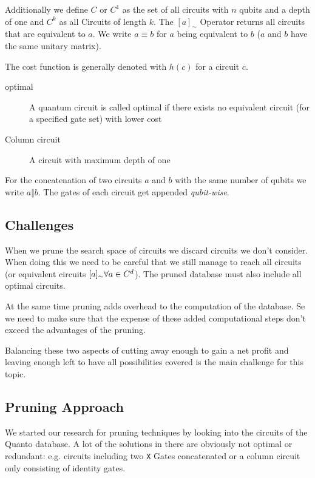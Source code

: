 Additionally we define $C$ or $C^1$ as the set of all circuits with $n$ qubits and a depth of one and $C^k$ as all Circuits of length $k$. The $[a]_\sim$ Operator returns all circuits that are equivalent to $a$. We write $a\equiv b$ for $a$ being equivalent to $b$ ($a$ and $b$ have the same unitary matrix).

The cost function is generally denoted with $h(c)$ for a circuit $c$.

\begin{description}
	\item[optimal] A quantum circuit is called optimal if there exists no equivalent circuit (for a specified gate set) with lower cost
	
	\item[Column circuit] A circuit with maximum depth of one
\end{description}

For the concatenation of two circuits $a$ and $b$ with the same number of qubits we write $a\Vert b$. The gates of each circuit get appended \textit{qubit-wise}.


\subsection{Challenges}
When we prune the search space of circuits we discard circuits we don't consider. When doing this we need to be careful that we still manage to reach all circuits 
(or equivalent circuits $[a]_\sim\space\forall a\in C^d$). The pruned database must also include all optimal circuits.

At the same time pruning adds overhead to the computation of the database. Se we need to make sure that the expense of these added computational steps don't exceed the advantages of the pruning.

Balancing these two aspects of cutting away enough to gain a net profit and leaving enough left to have all possibilities covered is the main challenge for this topic.

\subsection{Pruning Approach}
We started our research for pruning techniques by looking into the circuits of the Quanto database. A lot of the solutions in there are obviously not optimal or redundant: e.g. circuits including two \texttt{X} Gates concatenated or a column circuit only consisting of identity gates. 

